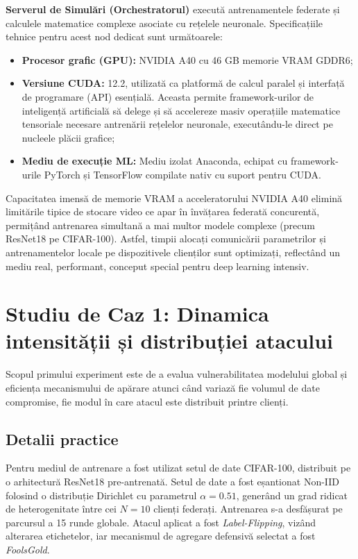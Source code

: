 \documentclass[../../main.tex]{subfiles}
\begin{document}
        \textbf{Serverul de Simulări (Orchestratorul)} execută antrenamentele federate și calculele matematice complexe asociate cu rețelele neuronale. Specificațiile tehnice pentru acest nod dedicat sunt următoarele:
        \begin{itemize}
            \item \textbf{Procesor grafic (GPU):} NVIDIA A40 cu 46 GB memorie VRAM GDDR6;
            \item \textbf{Versiune CUDA:} 12.2, utilizată ca platformă de calcul paralel și interfață de programare (API) esențială. Aceasta permite framework-urilor de inteli\-gență artificială să delege și să accelereze masiv operațiile matematice tensoriale necesare antrenării rețelelor neuronale, executându-le direct pe nucleele plăcii grafice;
            \item \textbf{Mediu de execuție ML:} Mediu izolat Anaconda, echipat cu framework-urile PyTorch și TensorFlow compilate nativ cu suport pentru CUDA.
        \end{itemize}

        Capacitatea imensă de memorie VRAM a acceleratorului NVIDIA A40 elimină limitările tipice de stocare video ce apar în învățarea federată concurentă, permițând antrenarea simultană a mai multor modele complexe (precum ResNet18 pe CIFAR-100). Astfel, timpii alocați comunicării parametrilor și antrenamentelor locale pe dispozitivele clienților sunt optimizați, reflectând un mediu real, performant, conceput special pentru deep learning intensiv.

    \section{Studiu de Caz 1: Dinamica intensității și distribu\-ției atacului}

        Scopul primului experiment este de a evalua vulnerabilitatea modelului global și eficiența mecanismului de apărare atunci când variază fie volumul de date compromise, fie modul în care atacul este distribuit printre clienți.

        \subsection{Detalii practice}
        Pentru mediul de antrenare a fost utilizat setul de date CIFAR-100, distribuit pe o arhitectură ResNet18 pre-antrenată. Setul de date a fost eșantionat Non-IID folosind o distribuție Dirichlet cu parametrul $\alpha = 0.51$, generând un grad ridicat de heterogenitate între cei $N=10$ clienți federați. Antrenarea s-a desfășurat pe parcursul a 15 runde globale. Atacul aplicat a fost \textit{Label-Flipping}, vizând alterarea etichetelor, iar mecanismul de agregare defensivă selectat a fost \textit{FoolsGold}.
\end{document}
